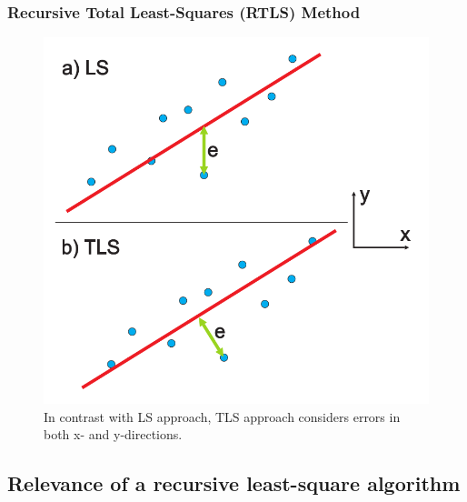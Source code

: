 \documentclass[usenames,dvipsnames]{beamer}
\begin{document}
\begin{frame}
 \frametitle{Recursive Total Least-Squares (RTLS) Method}

 \begin{figure}
  \includegraphics[scale=0.2]{images/LS_vs_TLS.png}
  \caption{In contrast with LS approach, TLS approach considers errors in both x- and y-directions.}
\label{images_vs}
 \end{figure}

\end{frame}


\subsection{Relevance of a recursive least-square algorithm}
\end{document}
